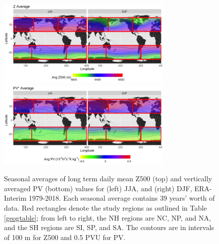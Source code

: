\documentclass[smallextended]{svjour3}       %
\numberwithin{equation}{section}
\begin{document}
\begin{figure}
\centering
\includegraphics[width=0.75\textwidth]{fig2a}
\includegraphics[width=0.75\textwidth]{fig2b}
\caption{Seasonal averages of long term daily mean Z500 (top) and vertically averaged PV (bottom) values for (left) JJA, and (right) DJF, ERA-Interim 1979-2018. Each seasonal average contains 39 years' worth of data. Red rectangles denote the study regions as outlined in Table \ref{geogtable}; from left to right, the NH regions are NC, NP, and NA, and the SH regions are SI, SP, and SA. The contours are in intervals of 100 m for Z500 and 0.5 PVU for PV.
}\label{avg}
\end{figure}
\end{document}
